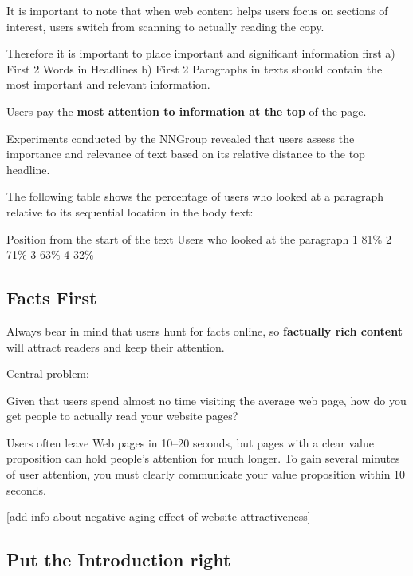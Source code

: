 It is important to note that when web content helps users focus on sections of interest, users switch from scanning to actually reading the copy.

Therefore it is important to place important and significant information first
a) First 2 Words in Headlines
b) First 2 Paragraphs in texts should contain the most important and relevant information.

Users pay the \textbf{most attention to information at the top} of the page.

Experiments conducted by the NNGroup revealed that users assess the importance and relevance of text based on its relative distance to the top headline. 

The following table shows the percentage of users who looked at a paragraph relative to its sequential location in the body text:

Position from the start of the text	Users who looked at the paragraph
1	81\%
2	71\%
3	63\%
4	32\%



\subsection{Facts First} %
\label{sub:fact_hunting}


Always bear in mind that users hunt for facts online, so \textbf{factually rich content} will attract readers and keep their attention.

Central problem:

Given that users spend almost no time visiting the average web page, how do you get people to actually read your website pages?

Users often leave Web pages in 10–20 seconds, but pages with a clear value proposition can hold people's attention for much longer. To gain several minutes of user attention, you must clearly communicate your value proposition within 10 seconds.

[add info about negative aging effect of website attractiveness]

\subsection{Put the Introduction right} %
\label{sub:put_the_introduction_right}


